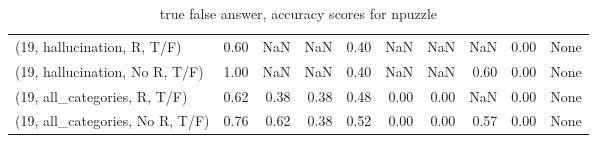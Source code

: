 \begin{table*}[h!]
\begin{adjustbox}{width=2\columnwidth,center}
\begin{tabular}{lrrr|rrr|rrr}
(19, hallucination, R, T/F)           &                      0.60 &                   NaN &                       NaN &                          0.40 &                       NaN &                           NaN &                                    NaN &                               0.00 &                                  None \\
(19, hallucination, No R, T/F)        &                      1.00 &                   NaN &                       NaN &                          0.40 &                       NaN &                           NaN &                                   0.60 &                               0.00 &                                  None \\
(19, all\_categories, R, T/F)          &                      0.62 &                  0.38 &                      0.38 &                          0.48 &                      0.00 &                          0.00 &                                    NaN &                               0.00 &                                  None \\
(19, all\_categories, No R, T/F)       &                      0.76 &                  0.62 &                      0.38 &                          0.52 &                      0.00 &                          0.00 &                                   0.57 &                               0.00 &                                  None \\


\bottomrule
\end{tabular}
\end{adjustbox}
\caption{true false answer, accuracy scores for npuzzle}
\end{table*}